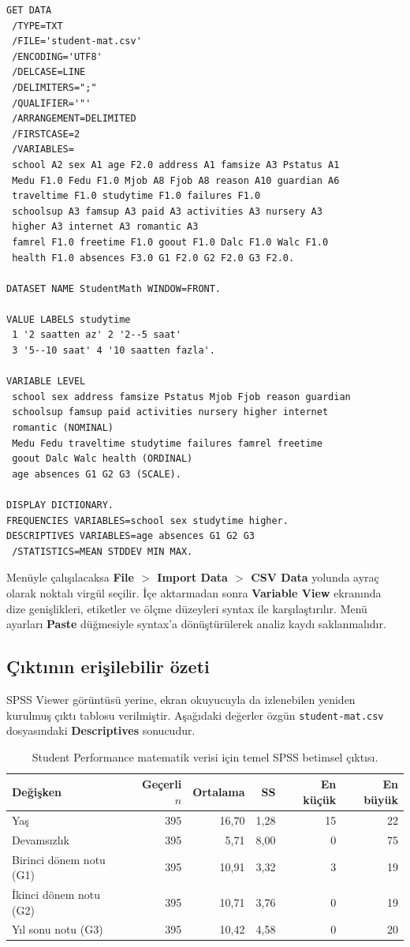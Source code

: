 \begin{lstlisting}[language={}]
GET DATA
 /TYPE=TXT
 /FILE='student-mat.csv'
 /ENCODING='UTF8'
 /DELCASE=LINE
 /DELIMITERS=";"
 /QUALIFIER='"'
 /ARRANGEMENT=DELIMITED
 /FIRSTCASE=2
 /VARIABLES=
 school A2 sex A1 age F2.0 address A1 famsize A3 Pstatus A1
 Medu F1.0 Fedu F1.0 Mjob A8 Fjob A8 reason A10 guardian A6
 traveltime F1.0 studytime F1.0 failures F1.0
 schoolsup A3 famsup A3 paid A3 activities A3 nursery A3
 higher A3 internet A3 romantic A3
 famrel F1.0 freetime F1.0 goout F1.0 Dalc F1.0 Walc F1.0
 health F1.0 absences F3.0 G1 F2.0 G2 F2.0 G3 F2.0.

DATASET NAME StudentMath WINDOW=FRONT.

VALUE LABELS studytime
 1 '2 saatten az' 2 '2--5 saat'
 3 '5--10 saat' 4 '10 saatten fazla'.

VARIABLE LEVEL
 school sex address famsize Pstatus Mjob Fjob reason guardian
 schoolsup famsup paid activities nursery higher internet
 romantic (NOMINAL)
 Medu Fedu traveltime studytime failures famrel freetime
 goout Dalc Walc health (ORDINAL)
 age absences G1 G2 G3 (SCALE).

DISPLAY DICTIONARY.
FREQUENCIES VARIABLES=school sex studytime higher.
DESCRIPTIVES VARIABLES=age absences G1 G2 G3
 /STATISTICS=MEAN STDDEV MIN MAX.
\end{lstlisting}

Menüyle çalışılacaksa \textbf{File $>$ Import Data $>$ CSV Data} yolunda
ayraç olarak noktalı virgül seçilir. İçe aktarmadan sonra \textbf{Variable
View} ekranında dize genişlikleri, etiketler ve ölçme düzeyleri syntax ile
karşılaştırılır. Menü ayarları \textbf{Paste} düğmesiyle syntax'a
dönüştürülerek analiz kaydı saklanmalıdır.

\subsection{Çıktının erişilebilir özeti}

SPSS Viewer görüntüsü yerine, ekran okuyucuyla da izlenebilen yeniden kurulmuş
çıktı tablosu verilmiştir. Aşağıdaki değerler özgün
\texttt{student-mat.csv} dosyasındaki \textbf{Descriptives} sonucudur.

\begin{table}[htbp]
\centering
\caption{Student Performance matematik verisi için temel SPSS betimsel çıktısı.}
\begin{tabular}{@{}lrrrrr@{}}
\toprule
Değişken & Geçerli $n$ & Ortalama & SS & En küçük & En büyük \\
\midrule
Yaş & 395 & 16,70 & 1,28 & 15 & 22 \\
Devamsızlık & 395 & 5,71 & 8,00 & 0 & 75 \\
Birinci dönem notu (G1) & 395 & 10,91 & 3,32 & 3 & 19 \\
İkinci dönem notu (G2) & 395 & 10,71 & 3,76 & 0 & 19 \\
Yıl sonu notu (G3) & 395 & 10,42 & 4,58 & 0 & 20 \\
\bottomrule
\end{tabular}
\end{table}


